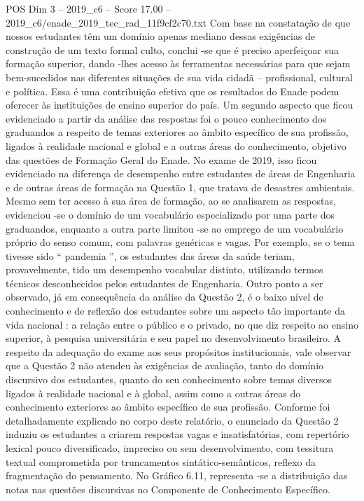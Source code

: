 \begin{textsample}{POS Dim 3 – 2019\_c6 – Score 17.00 – 2019\_c6/enade\_2019\_tec\_rad\_11f9cf2c70.txt}
Com base na constatação de que nossos estudantes têm um domínio apenas mediano dessas exigências de construção de um texto formal culto, conclui -se que é preciso aperfeiçoar sua formação superior, dando -lhes acesso às ferramentas necessárias para que sejam bem-sucedidos nas diferentes situações de sua vida cidadã – profissional, cultural e política.
Essa é uma contribuição efetiva que os resultados do Enade podem oferecer às instituições de ensino superior do país.
Um segundo aspecto que ficou evidenciado a partir da análise das respostas foi o pouco conhecimento dos graduandos a respeito de temas exteriores ao âmbito específico de sua profissão, ligados à realidade nacional e global e a outras áreas do conhecimento, objetivo das questões de Formação Geral do Enade.
No exame de 2019, isso ficou evidenciado na diferença de desempenho entre estudantes de áreas de Engenharia e de outras áreas de formação na Questão 1, que tratava de desastres ambientais.
Mesmo sem ter acesso à sua área de formação, ao se analisarem as respostas, evidenciou -se o domínio de um vocabulário especializado por uma parte dos graduandos, enquanto a outra parte limitou -se ao emprego de um vocabulário próprio do senso comum, com palavras genéricas e vagas.
Por exemplo, se o tema tivesse sido “ pandemia ”, os estudantes das áreas da saúde teriam, provavelmente, tido um desempenho vocabular distinto, utilizando termos técnicos desconhecidos pelos estudantes de Engenharia.
Outro ponto a ser observado, já em consequência da análise da Questão 2, é o baixo nível de conhecimento e de reflexão dos estudantes sobre um aspecto tão importante da vida nacional : a relação entre o público e o privado, no que diz respeito ao ensino superior, à pesquisa universitária e seu papel no desenvolvimento brasileiro.
A respeito da adequação do exame aos seus propósitos institucionais, vale observar que a Questão 2 não atendeu às exigências de avaliação, tanto do domínio discursivo dos estudantes, quanto do seu conhecimento sobre temas diversos ligados à realidade nacional e à global, assim como a outras áreas do conhecimento exteriores ao âmbito específico de sua profissão.
Conforme foi detalhadamente explicado no corpo deste relatório, o enunciado da Questão 2 induziu os estudantes a criarem respostas vagas e insatisfatórias, com repertório lexical pouco diversificado, impreciso ou sem desenvolvimento, com tessitura textual comprometida por truncamentos sintático-semânticos, reflexo da fragmentação do pensamento.
No Gráfico 6.11, representa -se a distribuição das notas nas questões discursivas no Componente de Conhecimento Específico.

\end{textsample}
